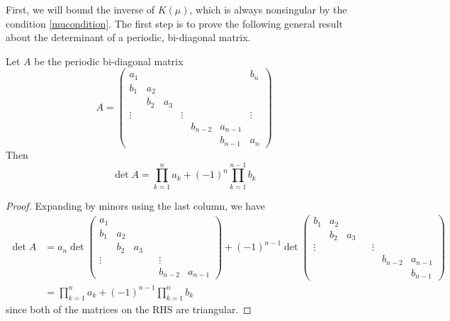 \documentclass[thesis.tex]{subfiles}
\begin{document}
First, we will bound the inverse of $K(\mu)$, which is always nonsingular by the condition \cref{mucondition}. The first step is to prove the following general result about the determinant of a periodic, bi-diagonal matrix.

\begin{lemma}\label{bidiag}
Let $A$ be the periodic bi-diagonal matrix
\begin{equation}
A = \begin{pmatrix}
a_1 & & & & & & b_n \\
b_1 & a_2 \\
& b_2 & a_3 \\
\vdots & & & \vdots & &&  \vdots \\
& & & & b_{n-2} & a_{n-1} \\
& & & & & b_{n-1} & a_n
\end{pmatrix}
\end{equation}
Then 
\begin{equation}
\det{A} = \prod_{k = 1}^n a_k + (-1)^n \prod_{k = 1}^{n-1} b_k
\end{equation}
\begin{proof}
Expanding by minors using the last column, we have
\begin{align*}
\det A &= a_n \det
\begin{pmatrix}
a_1 \\
b_1 & a_2 \\
& b_2 & a_3 \\
\vdots & & & & \vdots \\
& & & & b_{n-2} & a_{n-1}
\end{pmatrix}
+ (-1)^{n-1} \det
\begin{pmatrix}
b_1 & a_2 \\
& b_2 & a_3 \\
\vdots & & & & \vdots \\
& & & & & b_{n-2} & a_{n-1} \\
& & & & & & b_{n-1}
\end{pmatrix} \\
&= \prod_{k = 1}^n a_k + (-1)^{n-1} \prod_{k = 1}^n b_k
\end{align*}
since both of the matrices on the RHS are triangular.
\end{proof}
\end{lemma}
\end{document}
